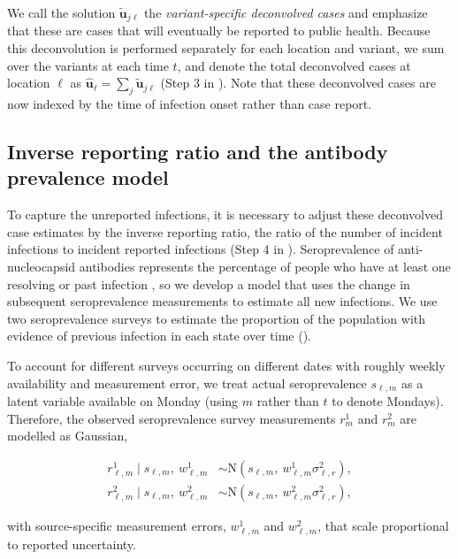 We call the solution $\widetilde{\mathbf{u}}_{j\ell}$ the \emph{variant-specific
deconvolved cases} and emphasize that these are cases that will eventually be
reported to public health. Because this deconvolution is performed separately
for each location and variant, we sum over the variants at each time $t$, and
denote the total deconvolved cases at location $\ell$ as
$\widehat{\mathbf{u}}_\ell = \sum_j \widetilde{\mathbf{u}}_{j\ell}$ (Step 3 in
). Note that these deconvolved cases are now
indexed by the time of infection onset rather than case report.




\subsection{Inverse reporting ratio and the antibody prevalence model} 
\label{sec:report-ratio}

To capture the unreported infections, it is necessary to adjust these
deconvolved case estimates by the inverse reporting ratio, the ratio of the
number of incident infections to incident reported infections (Step 4 in
). Seroprevalence of anti-nucleocapsid
antibodies represents the percentage of people who have at least one resolving
or past infection \citep{cdc2020data}, so we develop a model that uses the
change in subsequent seroprevalence measurements to estimate all new infections. 
We use two seroprevalence surveys to estimate the proportion of the
population with evidence of previous infection in each state over time  %
\citep{cdc2021blood, cdc2021comm} (). 

To account
for different surveys occurring on different dates with roughly weekly
availability and measurement error, we treat actual seroprevalence $s_{\ell,m}$
as a latent variable available on Monday (using $m$ rather than $t$ to denote
Mondays). Therefore, the observed seroprevalence survey measurements $r^1_m$ and
$r^2_m$ are modelled as Gaussian,
\begin{linenomath*}
\begin{align}
\label{eq:sero-measurements}
r^1_{\ell,m} \mid s_{\ell,m},\ w^1_{\ell,m} &\sim \textrm{N}(s_{\ell,m},\ w^1_{\ell,m}\sigma^2_{\ell,r}),\\
r^2_{\ell,m} \mid s_{\ell,m},\  w^2_{\ell,m}
  &\sim \textrm{N}(s_{\ell,m},\ w^2_{\ell,m}\sigma^2_{\ell,r}),
\end{align}
\end{linenomath*}
with source-specific measurement errors, $w^1_{\ell,m}$ and $w^2_{\ell,m}$, that
scale proportional to reported uncertainty.


